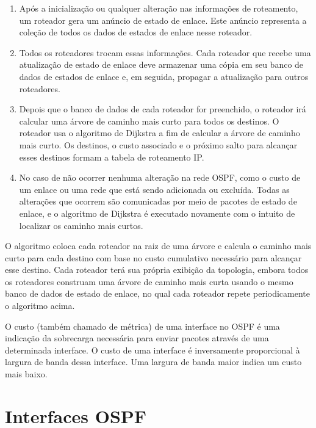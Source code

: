 \documentclass[12pt,a4paper]{report}
\begin{document}
\begin{enumerate}
\item Ap\'os a inicializa\c{c}\~ao ou qualquer altera\c{c}\~ao nas informa\c{c}\~oes de roteamento, um roteador gera um an\'uncio de estado de enlace. Este an\'uncio representa a cole\c{c}\~ao de todos os dados de estados de enlace nesse roteador.
\item Todos os roteadores trocam essas informa\c{c}\~oes. Cada roteador que recebe uma atualiza\c{c}\~ao de estado de enlace deve armazenar uma c\'opia em seu banco de dados de estados de enlace e, em seguida, propagar a atualiza\c{c}\~ao para outros roteadores.
\item Depois que o banco de dados de cada roteador for preenchido, o roteador ir\'a calcular uma \'arvore de caminho mais curto para todos os destinos. O roteador usa o algoritmo de Dijkstra a fim de calcular a \'arvore de caminho mais curto. Os destinos, o custo associado e o pr\'oximo salto para alcan\c{c}ar esses destinos formam a tabela de roteamento IP.
\item No caso de n\~ao ocorrer nenhuma altera\c{c}\~ao na rede OSPF, como o custo de um enlace ou uma rede que est\'a sendo adicionada ou exclu\'ida. Todas as altera\c{c}\~oes que ocorrem s\~ao comunicadas por meio de pacotes de estado de enlace, e o algoritmo de Dijkstra \'e executado novamente com o intuito de localizar os caminho mais curtos.

\end{enumerate}

O algoritmo coloca cada roteador na raiz de uma \'arvore e calcula o caminho mais curto para cada destino com base no custo cumulativo necess\'ario para alcan\c{c}ar esse destino. Cada roteador ter\'a sua pr\'opria exibi\c{c}\~ao da topologia, embora todos os roteadores construam uma \'arvore de caminho mais curta usando o mesmo banco de dados de estado de enlace, no qual cada roteador repete periodicamente o algoritmo acima.\cite{Kurose:2012:CNT:2584507} 

O custo (tamb\'em chamado de m\'etrica) de uma interface no OSPF \'e uma indica\c{c}\~ao da sobrecarga necess\'aria para enviar pacotes atrav\'es de uma determinada interface. O custo de uma interface \'e inversamente proporcional \`a largura de banda dessa interface. Uma largura de banda maior indica um custo mais baixo.

\section{Interfaces OSPF}
\end{document}
